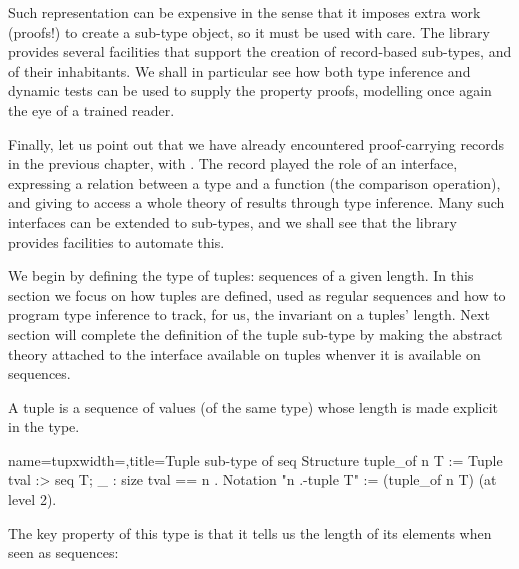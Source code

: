 Such representation can be expensive in the sense that it imposes
extra work (proofs!) to create a sub-type object, so it must be used
with care.  The \mcbMC{} library provides several facilities that
support the creation of record-based sub-types, and of their
inhabitants.  We shall in particular see how both type inference and
dynamic tests can be used to supply the property proofs, modelling
once again the eye of a trained reader.

Finally, let us point out that we have already encountered proof-carrying
records in the previous chapter, with .
The  record played the role of an interface,
expressing a relation between a type and a function (the comparison operation),
and giving to access a whole theory of results through type inference.
Many such interfaces can be extended to sub-types, and we shall see that
the \mcbMC{} library provides facilities to automate this.

\mcbLEARN{}
\mcbNOTES{}

We begin by defining the type of tuples: sequences of a given length.
In this section we focus on how tuples are defined, used as regular
sequences and how to program type inference to track, for us, the
invariant on a tuples' length.  Next section will complete the
definition of the tuple sub-type by making the abstract theory
attached to the  interface available on tuples whenver it is
available on sequences.

A tuple is a sequence of values (of the same type) whose length is
made explicit in the type.

\begin{coq}{name=tupx}{width=\textwidth,title=Tuple sub-type of seq}
Structure tuple_of n T :=  Tuple { tval :> seq T; _ : size tval == n }.
Notation "n .-tuple T" := (tuple_of n T) (at level 2).
\end{coq}


The key property of this type is that it tells us the length of its
elements when seen as sequences:


